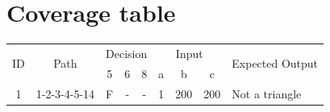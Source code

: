 \documentclass[12pt,a4paper]{article}
\newcommand{\nottriangle}{Not a triangle}
\begin{document}
\newpage
\section{Coverage table}

\begin{tabular}[pos]{ |*{8}{c|} l |}
   \hline
   \multirow{2}{*}{ID} & \multirow{2}{*}{Path} & \multicolumn{3}{|c|}{Decision} & \multicolumn{3}{|c|}{Input} & \multirow{2}{*}{Expected Output} \\ \cline{3-8}
                       & & 5 & 6 & 8 & a & b & c & \\ \hline
   1 & 1-2-3-4-5-14 & F & - & - & 1 & 200 & 200 & \nottriangle \\ \hline
\end{tabular}
\end{document}
